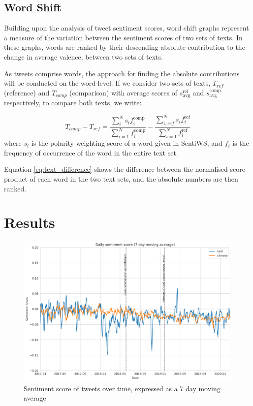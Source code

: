 \documentclass[12pt,onecolumn,twoside]{layout}
\begin{document}
\subsection*{Word Shift}
Building upon the analysis of tweet sentiment scores, word shift graphs represent a measure of the variation between the sentiment scores of two sets of texts. In these graphs, words are ranked by their descending absolute contribution to the change in average valence, between two sets of texts. 

As tweets comprise words, the approach for finding the absolute contributions will be conducted on the word-level. If we consider two sets of texts, \(T_{ref}\) (reference) and \(T_{comp}\) (comparison) with average scores of \(s_{\text{avg}}^{\text{ref}}\) and \(s_{\text{avg}}^{\text{comp}}\) respectively, to compare both texts, we write: 

\begin{equation}
\label{eq:text_difference}
T_{comp} - T_{ref} = \frac{\sum_{i}^{N} s_i f_i^{\text{comp}}}{\sum_{i=1}^{N} f_i^{\text{comp}}} - \frac{\sum_{i,ref}^{N} s_i f_i^{\text{ref}}}{\sum_{i=1}^{N} f_i^{\text{ref}}}
\end{equation} 	
where \(s_i\) is the polarity weighting score of a word given in SentiWS, and \(f_i\) is the frequency of occurrence of the word in the entire text set. 

Equation \ref{eq:text_difference} shows the difference between the normalised score product of each word in the two text sets, and the absolute numbers are then ranked. 

 

\section*{Results} \label{sec:results}

\begin{figure} 
	\begin{center}
		\includegraphics[width=\linewidth]{figures/sa_dailyavgsenti_7dma_baseline2}
	\end{center}
	\caption{Sentiment score of tweets over time, expressed as a 7 day moving average}
	\label{fig:tweet_score}
\end{figure}
\end{document}
